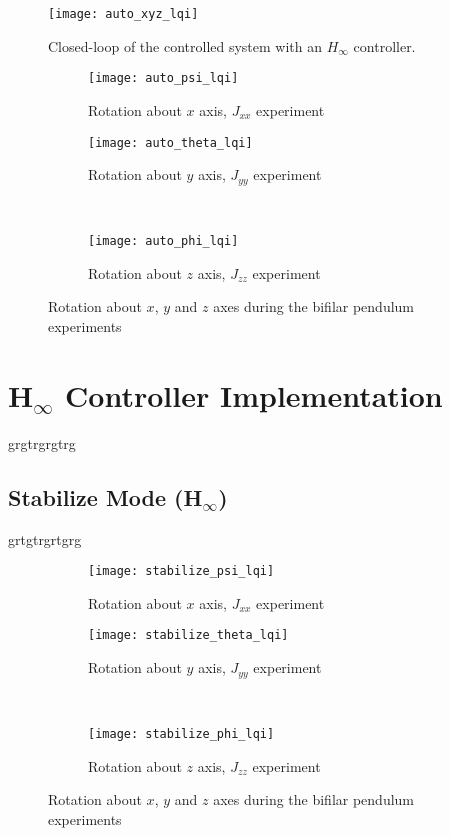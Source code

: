 \begin{figure}[h]
	\begin{center}
	\texttt{[image: auto\_xyz\_lqi]}
	\caption{Closed-loop of the controlled system with an $H_{\infty}$ controller.}
	\label{fig:auto_xyz_lqi}
	\end{center}
	\end{figure}
	
\begin{figure}[H]
\begin{subfigure}{.5\linewidth}
\centering
\texttt{[image: auto\_psi\_lqi]}
\caption{Rotation about $x$ axis, $J_{xx}$ experiment}
\label{fig:auto_psi_lqi}
\end{subfigure}%
\begin{subfigure}{.5\linewidth}
\centering
\texttt{[image: auto\_theta\_lqi]}
\caption{Rotation about $y$ axis, $J_{yy}$ experiment}
\label{fig:auto_theta_lqi}
\end{subfigure}\\[1ex]
\begin{subfigure}{\linewidth}
\centering
\texttt{[image: auto\_phi\_lqi]}
\caption{Rotation about $z$ axis, $J_{zz}$ experiment}
\label{fig:auto_psi_lqi}
\end{subfigure}
\caption{Rotation about $x$, $y$ and $z$ axes during the bifilar pendulum experiments}
\label{fig:auto_lqi}
\end{figure}



\section{H$_\infty$ Controller Implementation}
grgtrgrgtrg

\subsection{Stabilize Mode (H$_\infty$)}
grtgtrgrtgrg

\begin{figure}[H]
\begin{subfigure}{.5\linewidth}
\centering
\texttt{[image: stabilize\_psi\_lqi]}
\caption{Rotation about $x$ axis, $J_{xx}$ experiment}
\label{fig:stabilize_psi_lqi}
\end{subfigure}%
\begin{subfigure}{.5\linewidth}
\centering
\texttt{[image: stabilize\_theta\_lqi]}
\caption{Rotation about $y$ axis, $J_{yy}$ experiment}
\label{fig:stabilize_theta_lqi}
\end{subfigure}\\[1ex]
\begin{subfigure}{\linewidth}
\centering
\texttt{[image: stabilize\_phi\_lqi]}
\caption{Rotation about $z$ axis, $J_{zz}$ experiment}
\label{fig:stabilize_psi_lqi}
\end{subfigure}
\caption{Rotation about $x$, $y$ and $z$ axes during the bifilar pendulum experiments}
\label{fig:stabilize_lqi}
\end{figure}

